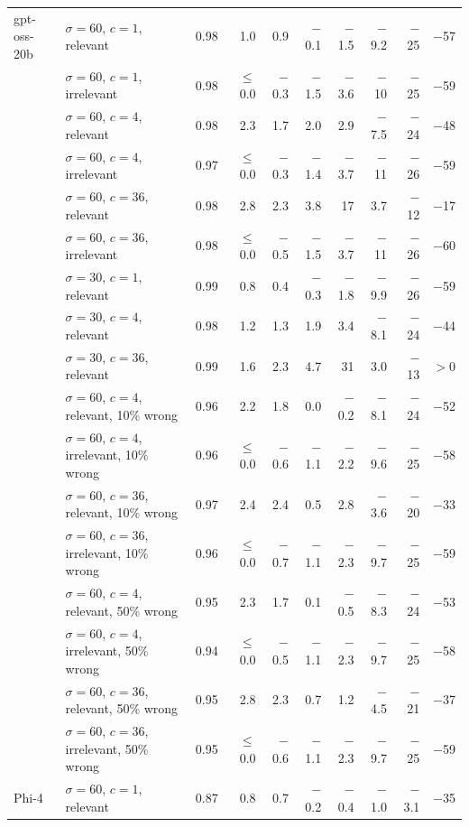 \begin{tabular}{llrrrrrrrr}
\midrule
gpt-oss-20b & $\sigma = 60$, $c = 1$, relevant & 0.98 & 1.0 & 0.9 & $-$0.1 & $-$1.5 & $-$9.2 & $-$25 & $-$57 \\
 & $\sigma = 60$, $c = 1$, irrelevant & 0.98 & $\leq$ 0.0 & $-$0.3 & $-$1.5 & $-$3.6 & $-$10 & $-$25 & $-$59 \\
 & $\sigma = 60$, $c = 4$, relevant & 0.98 & 2.3 & 1.7 & 2.0 & 2.9 & $-$7.5 & $-$24 & $-$48 \\
 & $\sigma = 60$, $c = 4$, irrelevant & 0.97 & $\leq$ 0.0 & $-$0.3 & $-$1.4 & $-$3.7 & $-$11 & $-$26 & $-$59 \\
 & $\sigma = 60$, $c = 36$, relevant & 0.98 & 2.8 & 2.3 & 3.8 & 17 & 3.7 & $-$12 & $-$17 \\
 & $\sigma = 60$, $c = 36$, irrelevant & 0.98 & $\leq$ 0.0 & $-$0.5 & $-$1.5 & $-$3.7 & $-$11 & $-$26 & $-$60 \\
 & $\sigma = 30$, $c = 1$, relevant & 0.99 & 0.8 & 0.4 & $-$0.3 & $-$1.8 & $-$9.9 & $-$26 & $-$59 \\
 & $\sigma = 30$, $c = 4$, relevant & 0.98 & 1.2 & 1.3 & 1.9 & 3.4 & $-$8.1 & $-$24 & $-$44 \\
 & $\sigma = 30$, $c = 36$, relevant & 0.99 & 1.6 & 2.3 & 4.7 & 31 & 3.0 & $-$13 & $> 0$ \\
 & $\sigma = 60$, $c = 4$, relevant, 10\% wrong & 0.96 & 2.2 & 1.8 & 0.0 & $-$0.2 & $-$8.1 & $-$24 & $-$52 \\
 & $\sigma = 60$, $c = 4$, irrelevant, 10\% wrong & 0.96 & $\leq$ 0.0 & $-$0.6 & $-$1.1 & $-$2.2 & $-$9.6 & $-$25 & $-$58 \\
 & $\sigma = 60$, $c = 36$, relevant, 10\% wrong & 0.97 & 2.4 & 2.4 & 0.5 & 2.8 & $-$3.6 & $-$20 & $-$33 \\
 & $\sigma = 60$, $c = 36$, irrelevant, 10\% wrong & 0.96 & $\leq$ 0.0 & $-$0.7 & $-$1.1 & $-$2.3 & $-$9.7 & $-$25 & $-$59 \\
 & $\sigma = 60$, $c = 4$, relevant, 50\% wrong & 0.95 & 2.3 & 1.7 & 0.1 & $-$0.5 & $-$8.3 & $-$24 & $-$53 \\
 & $\sigma = 60$, $c = 4$, irrelevant, 50\% wrong & 0.94 & $\leq$ 0.0 & $-$0.5 & $-$1.1 & $-$2.3 & $-$9.7 & $-$25 & $-$58 \\
 & $\sigma = 60$, $c = 36$, relevant, 50\% wrong & 0.95 & 2.8 & 2.3 & 0.7 & 1.2 & $-$4.5 & $-$21 & $-$37 \\
 & $\sigma = 60$, $c = 36$, irrelevant, 50\% wrong & 0.95 & $\leq$ 0.0 & $-$0.6 & $-$1.1 & $-$2.3 & $-$9.7 & $-$25 & $-$59 \\
\midrule
Phi-4 & $\sigma = 60$, $c = 1$, relevant & 0.87 & 0.8 & 0.7 & $-$0.2 & $-$0.4 & $-$1.0 & $-$3.1 & $-$35 \\

\end{tabular}
